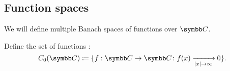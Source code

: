 \subsection{Function spaces}\label{subsec:function_spaces}

\begin{definition}\label{def:function_spaces}
  We will define multiple Banach spaces of functions over \( \Co \).

  \begin{defenum}
     Define the set of functions :
    \begin{equation*}
      C_0(\Co) \coloneqq \{ f: \Co \to \Co \colon f(x) \xrightarrow[\Abs{x} \to \infty]{} 0 \}.
    \end{equation*}
  \end{defenum}
\end{definition}
